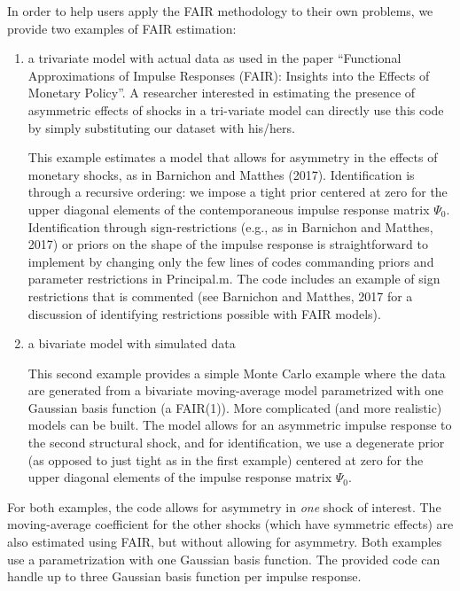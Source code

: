 \documentclass[a4paper,12pt]{article}
\begin{document}
In order to help users apply the FAIR methodology to their own problems, we provide two examples of FAIR estimation:
\begin{enumerate}
\item a trivariate model with actual data as used in the paper ``Functional Approximations of Impulse Responses (FAIR): Insights into the Effects of Monetary Policy''. A researcher interested in estimating the presence of asymmetric effects of shocks in a tri-variate model can directly use this code by simply substituting our dataset with his/hers.

This example estimates a model that allows for asymmetry in the effects of monetary shocks, as in Barnichon and Matthes (2017). Identification is through a recursive ordering: we impose a tight prior centered at zero for the upper diagonal elements of the contemporaneous impulse response matrix $\Psi_0$. Identification through sign-restrictions (e.g., as in Barnichon and Matthes, 2017) or priors on the shape of the impulse response is straightforward to implement by changing only the few lines of codes commanding priors and parameter restrictions in Principal.m. The code includes an example of sign restrictions that is commented (see Barnichon and Matthes, 2017 for a discussion of identifying restrictions possible with FAIR models). 

\item a bivariate model with simulated data  

This second example provides a simple Monte Carlo example where the data are generated from a bivariate moving-average model parametrized with one Gaussian basis function (a FAIR(1)). More complicated (and more realistic) models can be built. The model allows for an asymmetric impulse response to the second structural shock, and for identification, we use a degenerate prior (as opposed to just tight as in the first example) centered at zero for the upper diagonal elements of the impulse response matrix $\Psi_0$.

\end{enumerate}


For both examples, the code allows for asymmetry in \emph{one} shock of interest. The moving-average coefficient for the other shocks (which have symmetric effects) are also estimated using FAIR, but without allowing for asymmetry. Both examples use a parametrization with one Gaussian basis function. The provided code can handle up to three Gaussian basis function per impulse response.
\end{document}
